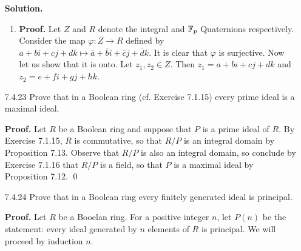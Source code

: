 \begin{enumerate}
      \textbf{Solution.}
      
      \begin{enumerate}
         \item \textbf{Proof.} Let $Z$ and $R$ denote the integral and $\mathbb{F}_p$
               Quaternions respectively. Consider the map
               $\varphi : Z \rightarrow R$ defined by
               $a + bi + cj + dk \mapsto \overline{a} + \overline{b}i +
                \overline{c}j +\overline{d}k$. It is clear that $\varphi$ is
                surjective. Now let us show that it is onto. Let
                $z_1, z_2 \in Z$. Then $z_1 = a + bi + cj + dk$ and
                $z_2 = e + fi + gj + hk$. 
      \end{enumerate}
   \item[7.4.23]  Prove that in a Boolean ring (cf. Exercise 7.1.15) every prime
                  ideal is a maximal ideal.
                  
      \textbf{Proof.} Let $R$ be a Boolean ring and suppose that $P$ is a prime
      ideal of $R$. By Exercise 7.1.15, $R$ is commutative, so that $R/P$ is
      an integral domain by Proposition 7.13. Observe that $R/P$ is also an
      integral domain, so conclude by Exercise 7.1.16 that $R/P$ is a field, so
      that $P$ is a maximal ideal by Proposition 7.12. \qed
   \item[7.4.24]  Prove that in a Boolean ring every finitely generated ideal is
                  principal.

      \textbf{Proof.} Let $R$ be a Booelan ring. For a positive integer $n$, let 
      $P(n)$ be the statement: every ideal generated by $n$ elements of $R$ is 
      principal. We will proceed by induction $n$.


\end{enumerate}
